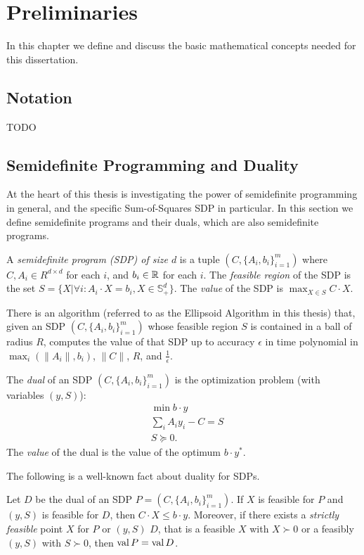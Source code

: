 \chapter{Preliminaries}
In this chapter we define and discuss the basic mathematical concepts needed for this dissertation.

\section{Notation}
TODO

\section{Semidefinite Programming and Duality}
At the heart of this thesis is investigating the power of semidefinite programming in general, and the specific Sum-of-Squares SDP in particular.
In this section we define semidefinite programs and their duals, which are also semidefinite programs. 

\begin{definition}
A \emph{semidefinite program (SDP) of size $d$} is a tuple $(C,\{A_i, b_i\}_{i=1}^m)$ where $C,A_i \in R^{d \times d}$ for each $i$, and $b_i \in \mathbb R$ for each $i$.
The \emph{feasible region} of the SDP is the set $S = \{X | \forall i: A_i \cdot X = b_i, X \in \mathbb{S}_+^d\}$.
The \emph{value} of the SDP is $\max_{X\in S} C \cdot X$. 
\end{definition}
\begin{fact}
There is an algorithm (referred to as the Ellipsoid Algorithm in this thesis) that, given an SDP $(C, \{A_i,b_i\}_{i=1}^m)$ whose feasible region $S$ is contained in a ball of radius $R$, computes the value of that SDP up to accuracy $\epsilon$ in time polynomial in $\max_i\left(\|A_i\|,b_i\right)$, $\|C\|$, $R$, and $\frac{1}{\epsilon}$.
\end{fact}

\begin{definition}
The \emph{dual} of an SDP $(C, \{A_i, b_i\}_{i=1}^m)$ is the optimization problem (with variables $(y,S)$): 
\begin{align*}
&\min b \cdot y \\
&\sum_i A_i y_i - C = S \\
&S \succeq 0.
\end{align*}
The \emph{value} of the dual is the value of the optimum $b \cdot y^*$. 
\end{definition}
The following is a well-known fact about duality for SDPs. 
\begin{lemma}
Let $D$ be the dual of an SDP $P = (C, \{A_i, b_i\}_{i=1}^m)$. If $X$ is feasible for $P$ and $(y,S)$ is feasible for $D$, then $C \cdot X \leq b \cdot y$. Moreover, if there exists a \emph{strictly feasible} point $X$ for $P$ or $(y,S)$ $D$, that is a feasible $X$ with $X \succ 0$ or a feasibly $(y,S)$ with $S \succ 0$, then $\operatorname{val}{P} = \operatorname{val}{D}$.
\end{lemma}

